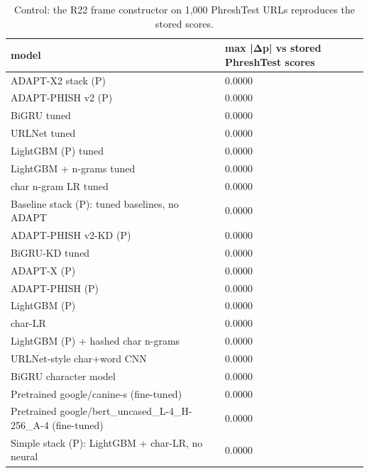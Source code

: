 \begin{table}[t]
\centering
\scriptsize
\caption{Control: the R22 frame constructor on 1,000 PhreshTest URLs reproduces the stored scores.}
\label{tab:rev_R22_constructor_control}
\begin{tabular}{ll}
\toprule
model & max |Δp| vs stored PhreshTest scores \\
\midrule
ADAPT-X2 stack (P) & 0.0000 \\
ADAPT-PHISH v2 (P) & 0.0000 \\
BiGRU tuned & 0.0000 \\
URLNet tuned & 0.0000 \\
LightGBM (P) tuned & 0.0000 \\
LightGBM + n-grams tuned & 0.0000 \\
char n-gram LR tuned & 0.0000 \\
Baseline stack (P): tuned baselines, no ADAPT & 0.0000 \\
ADAPT-PHISH v2-KD (P) & 0.0000 \\
BiGRU-KD tuned & 0.0000 \\
ADAPT-X (P) & 0.0000 \\
ADAPT-PHISH (P) & 0.0000 \\
LightGBM (P) & 0.0000 \\
char-LR & 0.0000 \\
LightGBM (P) + hashed char n-grams & 0.0000 \\
URLNet-style char+word CNN & 0.0000 \\
BiGRU character model & 0.0000 \\
Pretrained google/canine-s (fine-tuned) & 0.0000 \\
Pretrained google/bert\_uncased\_L-4\_H-256\_A-4 (fine-tuned) & 0.0000 \\
Simple stack (P): LightGBM + char-LR, no neural & 0.0000 \\
\bottomrule
\end{tabular}
\end{table}